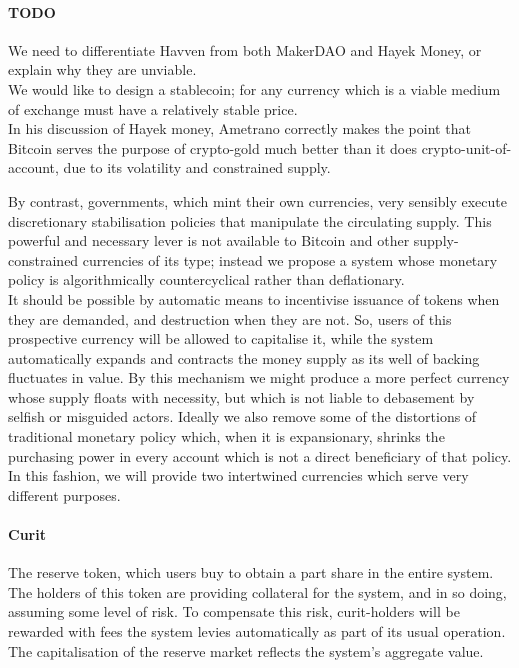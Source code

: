 \documentclass{article}
\begin{document}
\paragraph{TODO}
We need to differentiate Havven from both MakerDAO and Hayek Money, or explain why they are unviable.\\

We would like to design a stablecoin; for any currency which is a viable medium of exchange
must have a relatively stable price.\\

In his discussion of Hayek money, Ametrano correctly makes the point that Bitcoin
serves the purpose of crypto-gold much better than it does crypto-unit-of-account, due to its volatility and
constrained supply.~\cite{ametrano2016hayek}

\noindent By contrast, governments, which mint their own currencies, very sensibly execute discretionary
stabilisation policies that manipulate the circulating supply.
This powerful and necessary lever is not available to Bitcoin and other supply-constrained
currencies of its type; instead we propose a system whose monetary policy is algorithmically
countercyclical rather than deflationary. \\

It should be possible by automatic means to incentivise issuance of tokens when they are demanded,
and destruction when they are not. So, users of this prospective currency will be allowed to
capitalise it, while the system automatically expands and contracts the money supply as its well of backing
fluctuates in value. By this mechanism we might produce a more perfect currency whose supply floats with
necessity, but which is not liable to debasement by selfish or misguided actors.
Ideally we also remove some of the distortions of traditional monetary policy which, when it is expansionary,
shrinks the purchasing power in every account which is not a direct beneficiary of that policy.
In this fashion, we will provide two intertwined currencies which serve very different purposes.

\paragraph{Curit} The reserve token, which users buy to obtain a part share in the entire system. The holders
of this token are providing collateral for the system, and in so doing, assuming some level of risk.
To compensate this risk, curit-holders will be rewarded with fees the system levies automatically as
part of its usual operation. The capitalisation of the reserve market reflects the system's aggregate value.
\end{document}
